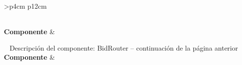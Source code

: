 \begin{longtable}{
    >{}p{4cm}
    p{12cm}
    }
    \caption{Descripción del componente:  BidRouter} \label{table:descripcion_bidrouter} \\
    \toprule
    \textbf{Componente} &  \\
    \endfirsthead
    
    {{ \tablename\ \thetable{} Descripción del componente:  BidRouter -- continuación de la página anterior}} \\
    \toprule
    \textbf{Componente} &  \\
    \midrule
    \endhead
    
    \midrule
     \\ 
    \endfoot
    
    \bottomrule
    \endlastfoot
    

\end{longtable}
